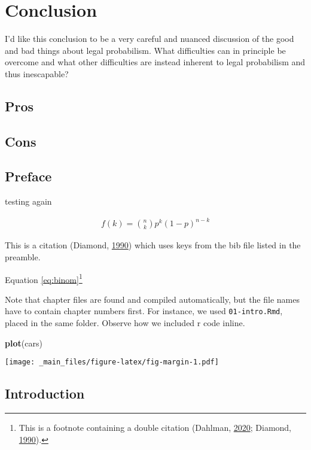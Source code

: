 \documentclass[]{book}
\newenvironment{Shaded}{\begin{snugshade}}{\end{snugshade}}
\newcommand{\KeywordTok}[1]{\textcolor[rgb]{0.13,0.29,0.53}{\textbf{#1}}}
\newcommand{\NormalTok}[1]{#1}
\begin{document}
\part{Conclusion}

I'd like this conclusion to be a very careful and nuanced discussion of
the good and bad things about legal probabilism. What difficulties can
in principle be overcome and what other difficulties are instead
inherent to legal probabilism and thus inescapable?

\chapter{Pros}

\chapter{Cons}

\chapter*{Preface}\label{preface}

testing again

\begin{align} 
  f\left(k\right) = \binom{n}{k} p^k\left(1-p\right)^{n-k}
  \label{eq:binom}
\end{align}

This is a citation (Diamond, \protect\hyperlink{ref-diamond90}{1990})
which uses keys from the bib file listed in the preamble.

Equation \eqref{eq:binom}\footnote{This is a footnote containing a double
  citation (Dahlman, \protect\hyperlink{ref-dahlmanNakedStat2020}{2020};
  Diamond, \protect\hyperlink{ref-diamond90}{1990}).}

Note that chapter files are found and compiled automatically, but the
file names have to contain chapter numbers first. For instance, we used
\texttt{01-intro.Rmd}, placed in the same folder. Observe how we
included r code inline.

\begin{Shaded}
\begin{Highlighting}[]
\KeywordTok{plot}\NormalTok{(cars)}
\end{Highlighting}
\end{Shaded}

\texttt{[image: \_main\_files/figure-latex/fig-margin-1.pdf]}

\chapter{Introduction}\label{ch:intro}
\end{document}
